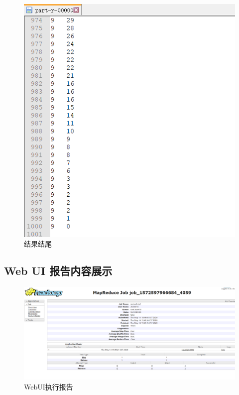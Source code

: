 \documentclass[a4paper,UTF8]{article}
\numberwithin{equation}{section}
\begin{document}
\begin{figure}[H]
	\centering
	\includegraphics[width = 15cm]{res2.PNG}
	\caption{结果结尾}
\end{figure}

\subsection{Web UI 报告内容展示}
\begin{figure}[H]
	\centering
	\includegraphics[width = 15cm]{job.PNG}
	\caption{WebUI执行报告}
\end{figure}
\end{document}
